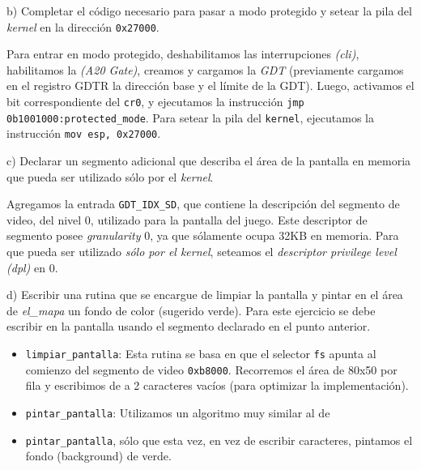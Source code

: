 \vspace*{0.5cm} \noindent



\noindent
b) Completar el código necesario para pasar a modo protegido y setear la pila del \textit{kernel}
en la dirección \verb|0x27000|.

\vspace*{0.3cm}

Para entrar en modo protegido, deshabilitamos las interrupciones \textit{(cli)}, habilitamos la 
\textit{(A20 Gate)}, creamos y cargamos la \textit{GDT} (previamente cargamos en el registro GDTR la 
dirección base y el límite de la GDT). Luego, activamos el bit correspondiente del \verb|cr0|, y 
ejecutamos la instrucci\'on \verb|jmp 0b1001000:protected_mode|. Para setear la pila del \verb|kernel|, ejecutamos 
la instrucci\'on \verb|mov esp, 0x27000|.

\vspace*{0.5cm} \noindent



\noindent
c) Declarar un segmento adicional que describa el área de la pantalla en memoria que pueda ser 
utilizado sólo por el \textit{kernel}.

\vspace*{0.3cm}

Agregamos la entrada \verb|GDT_IDX_SD|, que contiene la descripci\'on del segmento de video, del nivel 0, 
utilizado para la pantalla del juego. Este descriptor de segmento posee \textit{granularity} 0, ya que 
sólamente ocupa 32KB en memoria. Para que pueda ser utilizado \textit{sólo por el kernel}, seteamos el 
\textit{descriptor privilege level (dpl)} en 0.



\vspace*{0.5cm} \noindent



\noindent
d) Escribir una rutina que se encargue de limpiar la pantalla y pintar en el área de \textit{el_mapa} un 
fondo de color (sugerido verde). Para este ejercicio se debe escribir en la pantalla usando el segmento 
declarado en el punto anterior.

\vspace*{0.3cm}

\begin{itemize}
  
  \item \verb|limpiar_pantalla|: Esta rutina se basa en que el selector \verb|fs| apunta al comienzo del segmento de video \verb|0xb8000|. 
  Recorremos el \'area de 80x50 por fila y escribimos de a 2 caracteres vac\'ios (para optimizar la 
  implementaci\'on).

  \item \verb|pintar_pantalla|: Utilizamos un algoritmo muy similar al de \item \verb|pintar_pantalla|, s\'olo 
  que esta vez, en vez de escribir caracteres, pintamos el fondo (background) de verde.
 
\end{itemize}



